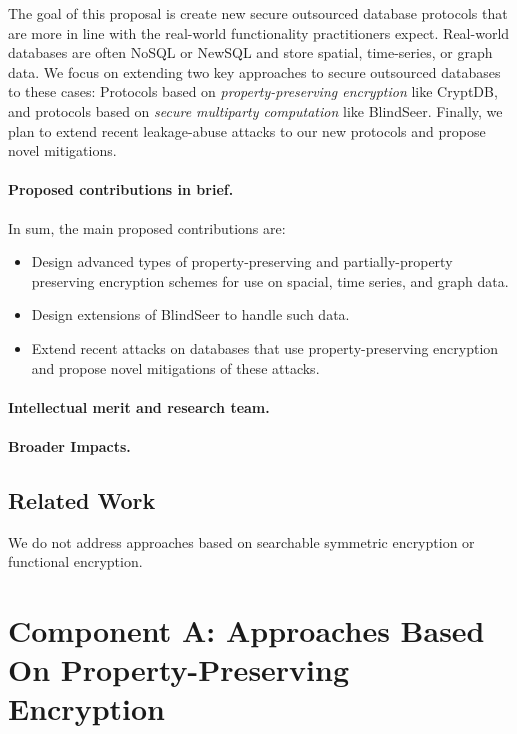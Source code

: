 \documentclass[11pt]{article}
\theoremstyle{remark}
\begin{document}
The goal of this proposal is create new secure outsourced database protocols that are more in line with the real-world functionality practitioners expect.  Real-world databases are often NoSQL or NewSQL and store spatial, time-series, or graph data.  We focus on extending two key approaches to secure outsourced databases to these cases: Protocols based on \emph{property-preserving encryption} like CryptDB, and protocols based on \emph{secure multiparty computation} like BlindSeer.  Finally, we plan to extend recent leakage-abuse attacks to our new protocols and propose novel mitigations.

\paragraph*{Proposed contributions in brief.}
In sum, the main proposed contributions are:
\begin{itemize}
\item Design advanced types of property-preserving and partially-property preserving encryption schemes for use on spacial, time series, and graph data.
\item Design extensions of BlindSeer to handle such data.
\item Extend recent attacks on databases that use property-preserving encryption and propose novel mitigations of these attacks. 
\end{itemize}

\paragraph*{Intellectual merit and research team.}  

 \paragraph*{Broader Impacts.}

\subsection{Related Work}

We do not address approaches based on searchable symmetric encryption or functional encryption.  

\section{Component A:  Approaches Based On Property-Preserving Encryption}
\end{document}
